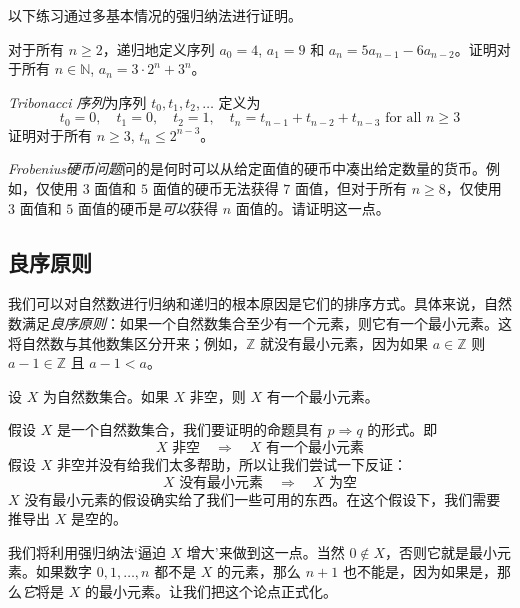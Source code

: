 以下练习通过多基本情况的强归纳法进行证明。

\begin{exercise}
对于所有 $n \ge 2$，递归地定义序列 $a_0 = 4$, $a_1 = 9$ 和 $a_n = 5a_{n-1} - 6a_{n-2}$。证明对于所有 $n \in \mathbb{N}$, $a_n = 3 \cdot 2^n + 3^n$。
\end{exercise}

\begin{exercise}
\textit{Tribonacci 序列}为序列 $t_0, t_1, t_2, \dots$ 定义为
\[ t_0 = 0, \quad t_1 = 0, \quad t_2 = 1, \quad t_n = t_{n-1} + t_{n-2} + t_{n-3} \text{ for all } n \ge 3 \]
证明对于所有 $n \ge 3$, $t_n \le 2^{n-3}$。
\end{exercise}

\begin{exercise}
\textit{Frobenius硬币问题}问的是何时可以从给定面值的硬币中凑出给定数量的货币。例如，仅使用 $3$ 面值和 $5$ 面值的硬币无法获得 $7$ 面值，但对于所有 $n \ge 8$，仅使用 $3$ 面值和 $5$ 面值的硬币是\textit{可以}获得 $n$ 面值的。请证明这一点。
\end{exercise}

\subsection*{良序原则}

我们可以对自然数进行归纳和递归的根本原因是它们的排序方式。具体来说，自然数满足\textit{良序原则}：如果一个自然数集合至少有一个元素，则它有一个最小元素。这将自然数与其他数集区分开来；例如，$\mathbb{Z}$ 就没有最小元素，因为如果 $a \in \mathbb{Z}$ 则 $a-1 \in \mathbb{Z}$ 且 $a-1 < a$。

\begin{theorem}[良序原则]
\label{thmWellOrderingPrinciple}
设 $X$ 为自然数集合。如果 $X$ 非空，则 $X$ 有一个最小元素。
\end{theorem}

\begin{cidea}
假设 $X$ 是一个自然数集合，我们要证明的命题具有 $p \Rightarrow q$ 的形式。即
\[ X \text{ 非空} \quad \Rightarrow \quad X \text{ 有一个最小元素} \]
假设 $X$ 非空并没有给我们太多帮助，所以让我们尝试一下反证：
\[ X \text{ 没有最小元素} \quad \Rightarrow \quad X \text{ 为空} \]
$X$ 没有最小元素的假设确实给了我们一些可用的东西。在这个假设下，我们需要推导出 $X$ 是空的。

我们将利用强归纳法`逼迫 $X$ 增大'来做到这一点。当然 $0 \not \in X$，否则它就是最小元素。如果数字 $0, 1, \dots, n$ 都不是 $X$ 的元素，那么 $n+1$ 也不能是，因为如果是，那么\textit{它}将是 $X$ 的最小元素。让我们把这个论点正式化。
\end{cidea}

